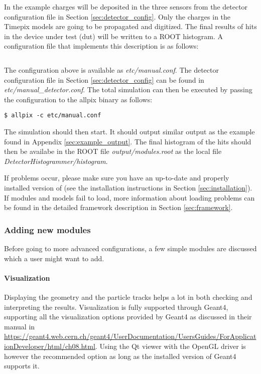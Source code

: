 In the example charges will be deposited in the three sensors from the detector configuration file in Section \ref{sec:detector_config}. Only the charges in the Timepix models are going to be propagated and digitized. The final results of hits in the device under test (dut) will be written to a ROOT histogram. A configuration file that implements this description is as follows:
\inputminted[frame=single,framesep=3pt,breaklines=true,tabsize=2,linenos]{ini}{../../etc/manual.conf}

The configuration above is available as \textit{etc/manual.conf}. The detector configuration file in Section \ref{sec:detector_config} can be found in \textit{etc/manual\_detector.conf}. The total simulation can then be executed by passing the configuration to the allpix binary as follows:

\begin{verbatim}
$ allpix -c etc/manual.conf
\end{verbatim}
The simulation should then start. It should output similar output as the example found in Appendix \ref{sec:example_output}. The final histogram of the hits should then be availabe in the ROOT file \textit{output/modules.root} as the local file \textit{DetectorHistogrammer/histogram}.

If problems occur, please make sure you have an up-to-date and properly installed version of \apsq (see the installation instructions in Section \ref{sec:installation}). If modules and models fail to load, more information about loading problems can be found in the detailed framework description in Section \ref{sec:framework}.

\subsubsection{Adding new modules}
Before going to more advanced configurations, a few simple modules are discussed which a user might want to add.

\paragraph{Visualization}
Displaying the geometry and the particle tracks helps a lot in both checking and interpreting the results. Visualization is fully supported through Geant4, supporting all the visualization options provided by Geant4 as discussed in their manual in \url{https://geant4.web.cern.ch/geant4/UserDocumentation/UsersGuides/ForApplicationDeveloper/html/ch08.html}. Using the Qt viewer with the OpenGL driver is however the recommended option as long as the installed version of Geant4 supports it.

